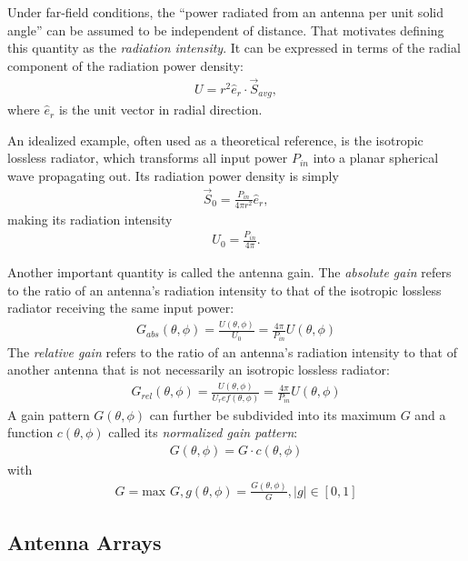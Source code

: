 Under far-field conditions,
the ``power radiated from an antenna per unit solid angle'' can be assumed to be independent of distance.
That motivates defining this quantity as the \emph{radiation intensity}.
It can be expressed in terms of the radial component of the radiation power density:
\begin{align}
    U = r^2 \hat e_r \cdot \vec S_{avg},
\end{align}
where $\hat e_r$ is the unit vector in radial direction.

An idealized example, often used as a theoretical reference, is the isotropic lossless radiator,
which transforms all input power $P_{in}$ into a planar spherical wave propagating out.
Its radiation power density is simply
\begin{align}
    \vec S_{0} = \frac{P_{in}}{4\pi r^2} \hat e_r,
\end{align}
making its radiation intensity
\begin{align}
    U_{0} = \frac{P_{in}}{4\pi}.
\end{align}

Another important quantity is called the antenna gain.
The \emph{absolute gain} refers to the ratio of an antenna's radiation intensity
to that of the isotropic lossless radiator receiving the same input power:
\begin{align}
    G_{abs}(\theta, \phi) = \frac{U(\theta, \phi)}{U_0} = \frac{4\pi}{P_{in}} U(\theta, \phi)
\end{align}
The  \emph{relative gain} refers to the ratio of an antenna's radiation intensity
to that of another antenna that is not necessarily an isotropic lossless radiator:
\begin{align}
    G_{rel}(\theta, \phi) = \frac{U(\theta, \phi)}{U_ref(\theta, \phi)} = \frac{4\pi}{P_{in}} U(\theta, \phi)
\end{align}
A gain pattern $G(\theta, \phi)$ can further be subdivided into its maximum $G$
and a function $c(\theta, \phi)$ called its \emph{normalized gain pattern}:
\begin{align}
    G(\theta, \phi) = G \cdot c(\theta, \phi)
\end{align}
with
\begin{align*}
    G = \text{max }G, g(\theta, \phi) = \frac{G(\theta, \phi)}{G}, |g| \in [0,1]
\end{align*}

\subsection{Antenna Arrays}

